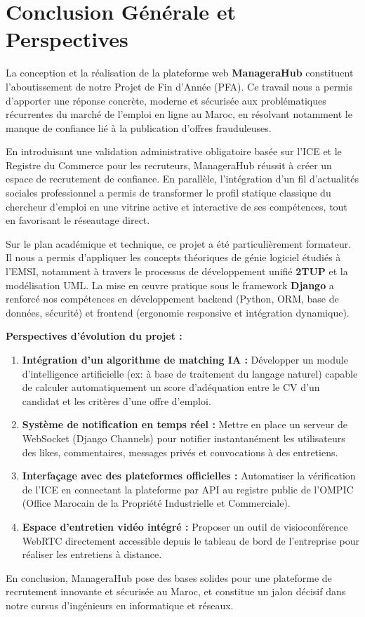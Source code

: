 \chapter*{Conclusion Générale et Perspectives}

La conception et la réalisation de la plateforme web \textbf{ManageraHub} constituent l'aboutissement de notre Projet de Fin d'Année (PFA). Ce travail nous a permis d'apporter une réponse concrète, moderne et sécurisée aux problématiques récurrentes du marché de l'emploi en ligne au Maroc, en résolvant notamment le manque de confiance lié à la publication d'offres frauduleuses.

En introduisant une validation administrative obligatoire basée sur l'ICE et le Registre du Commerce pour les recruteurs, ManageraHub réussit à créer un espace de recrutement de confiance. En parallèle, l'intégration d'un fil d'actualités sociales professionnel a permis de transformer le profil statique classique du chercheur d'emploi en une vitrine active et interactive de ses compétences, tout en favorisant le réseautage direct.

Sur le plan académique et technique, ce projet a été particulièrement formateur. Il nous a permis d'appliquer les concepts théoriques de génie logiciel étudiés à l'EMSI, notamment à travers le processus de développement unifié \textbf{2TUP} et la modélisation UML. La mise en œuvre pratique sous le framework \textbf{Django} a renforcé nos compétences en développement backend (Python, ORM, base de données, sécurité) et frontend (ergonomie responsive et intégration dynamique).

\vspace{0.5cm}
\noindent \textbf{Perspectives d'évolution du projet :}
\begin{enumerate}
    \item \textbf{Intégration d'un algorithme de matching IA :} Développer un module d'intelligence artificielle (ex: à base de traitement du langage naturel) capable de calculer automatiquement un score d'adéquation entre le CV d'un candidat et les critères d'une offre d'emploi.
    \item \textbf{Système de notification en temps réel :} Mettre en place un serveur de WebSocket (Django Channels) pour notifier instantanément les utilisateurs des likes, commentaires, messages privés et convocations à des entretiens.
    \item \textbf{Interfaçage avec des plateformes officielles :} Automatiser la vérification de l'ICE en connectant la plateforme par API au registre public de l'OMPIC (Office Marocain de la Propriété Industrielle et Commerciale).
    \item \textbf{Espace d'entretien vidéo intégré :} Proposer un outil de visioconférence WebRTC directement accessible depuis le tableau de bord de l'entreprise pour réaliser les entretiens à distance.
\end{enumerate}

En conclusion, ManageraHub pose des bases solides pour une plateforme de recrutement innovante et sécurisée au Maroc, et constitue un jalon décisif dans notre cursus d'ingénieurs en informatique et réseaux.
\newpage
